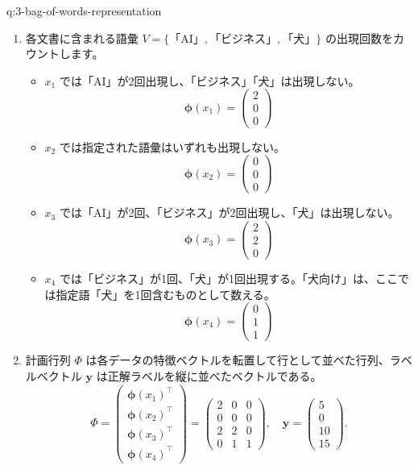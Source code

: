 \documentclass[
  pandoc]{bxjsarticle}
\providecommand{\tightlist}{%
  \setlength{\itemsep}{0pt}\setlength{\parskip}{0pt}}
\begin{document}
\begin{answerbox}[phantomlabel=a:3-bag-of-words-representation]{q:3-bag-of-words-representation}

\begin{enumerate}
\def\labelenumi{\arabic{enumi}.}
\tightlist
\item
  各文書に含まれる語彙
  \(V = \{\text{「AI」}, \text{「ビジネス」}, \text{「犬」}\}\)
  の出現回数をカウントします。

  \begin{itemize}
  \tightlist
  \item
    \(x_1\) では「AI」が2回出現し、「ビジネス」「犬」は出現しない。
    \[\boldsymbol{\phi}(x_1) = \begin{pmatrix} 2 \\ 0 \\ 0 \end{pmatrix}\]
  \item
    \(x_2\) では指定された語彙はいずれも出現しない。
    \[\boldsymbol{\phi}(x_2) = \begin{pmatrix} 0 \\ 0 \\ 0 \end{pmatrix}\]
  \item
    \(x_3\)
    では「AI」が2回、「ビジネス」が2回出現し、「犬」は出現しない。
    \[\boldsymbol{\phi}(x_3) = \begin{pmatrix} 2 \\ 2 \\ 0 \end{pmatrix}\]
  \item
    \(x_4\)
    では「ビジネス」が1回、「犬」が1回出現する。「犬向け」は、ここでは指定語「犬」を1回含むものとして数える。
    \[\boldsymbol{\phi}(x_4) = \begin{pmatrix} 0 \\ 1 \\ 1 \end{pmatrix}\]
  \end{itemize}
\item
  計画行列 \(\Phi\)
  は各データの特徴ベクトルを転置して行として並べた行列、ラベルベクトル
  \(\mathbf{y}\) は正解ラベルを縦に並べたベクトルである。 \[
  \Phi
  =
  \begin{pmatrix}
  \boldsymbol{\phi}(x_1)^\top \\
  \boldsymbol{\phi}(x_2)^\top \\
  \boldsymbol{\phi}(x_3)^\top \\
  \boldsymbol{\phi}(x_4)^\top
  \end{pmatrix}
  =
  \begin{pmatrix}
  2 & 0 & 0 \\
  0 & 0 & 0 \\
  2 & 2 & 0 \\
  0 & 1 & 1
  \end{pmatrix},
  \quad
  \mathbf{y}
  =
  \begin{pmatrix}
  5 \\
  0 \\
  10 \\
  15
  \end{pmatrix}.
  \]
\end{enumerate}


\end{answerbox}
\end{document}
